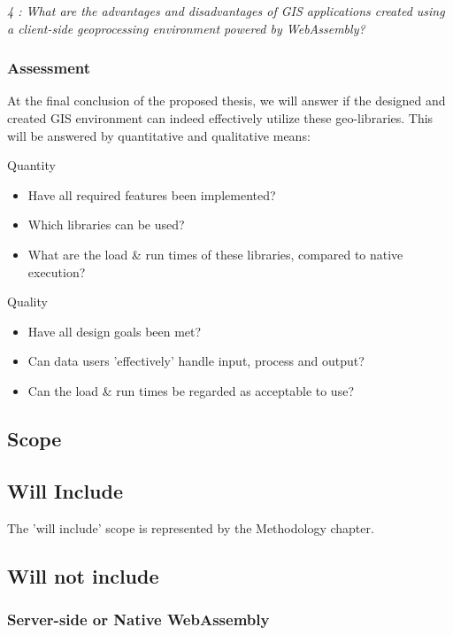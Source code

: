 \textit{4 : What are the advantages and disadvantages of GIS applications created using a client-side geoprocessing environment powered by WebAssembly?}

\newpage
\subsubsection*{Assessment}

At the final conclusion of the proposed thesis, we will answer if the designed and created GIS environment can indeed effectively utilize these geo-libraries.
This will be answered by quantitative and qualitative means:

Quantity
\begin{itemize}
    \item Have all required features been implemented?
    \item Which libraries can be used?
    \item What are the load \& run times of these libraries, compared to native execution?
\end{itemize} 

Quality
\begin{itemize}
    \item Have all design goals been met?
    \item Can data users 'effectively' handle input, process and output?
    \item Can the load \& run times be regarded as acceptable to use? 
\end{itemize} 


\newpage
\subsection{Scope}
\subsection*{Will Include}

The 'will include' scope is represented by the Methodology chapter. 

\subsection*{Will not include}

\subsubsection*{Server-side or Native WebAssembly} %


